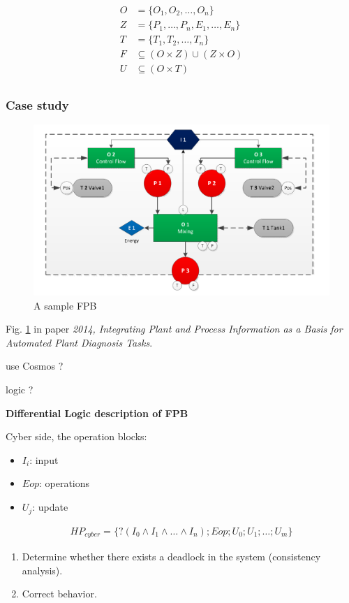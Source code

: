 \begin{align*}
  O &= \{O_1, O_2, \dots, O_n\} \\
  Z &= \{P_1, \dots, P_n, E_1, \dots, E_n\} \\
  T &= \{T_1, T_2, \dots, T_n\} \\
  F &\subseteq (O \times Z) \cup (Z \times O) \\
  U &\subseteq (O \times T) \\
\end{align*}

\subsubsection{Case study}

\begin{figure}
  \centering
  \includegraphics[width=.8\textwidth]{notes/project/AITOC-2020/img/FPB.png}
  \caption{A sample FPB}
  \label{fig:aitoc-wp1-as-fpb}
\end{figure}

Fig. \ref{fig:aitoc-wp1-as-fpb} in paper \textit{2014, Integrating Plant and 
  Process Information as a Basis for Automated Plant Diagnosis Tasks}.

use Cosmos ?

logic ?

\textbf{Differential Logic description of FPB}

Cyber side, the operation blocks:

\begin{itemize}
  \item $I_i$: input
  \item $Eop$: operations
  \item $U_j$: update
\end{itemize}

\begin{align*}
  HP_{cyber} = \{?(I_0 \wedge I_1 \wedge \dots \wedge I_n);
    Eop; U_0; U_1; \dots; U_m\}  
\end{align*}

\begin{enumerate}
  \item Determine whether there exists a deadlock in the system 
    (consistency analysis).
  \item Correct behavior.
\end{enumerate}

